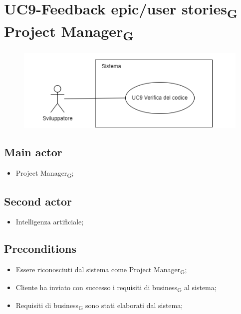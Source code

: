 \documentclass{article}
\begin{document}
\section{UC9-Feedback epic/user stories\textsubscript{G} Project Manager\textsubscript{G}}
    \begin{figure}[h]
      \centering
      \includegraphics{./imgUML/UC9.png}
      \label{fig:immagine}
    \end{figure}
    \subsection*{Main actor}
    \begin{itemize}
        \item Project Manager\textsubscript{G};
    \end{itemize}
    \subsection{Second actor}
    \begin{itemize}
        \item Intelligenza artificiale;
    \end{itemize}
    
    \subsection*{Preconditions}
        \begin{itemize}
            \item Essere riconosciuti dal sistema come Project Manager\textsubscript{G};
            \item Cliente ha inviato con successo i requisiti di business\textsubscript{G} al sistema;
            \item Requisiti di business\textsubscript{G} sono stati elaborati dal sistema;
        \end{itemize}
        
\end{document}

